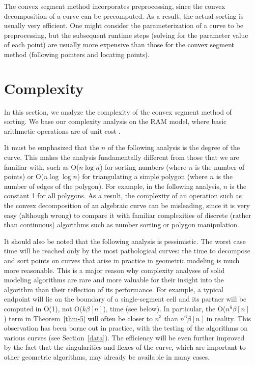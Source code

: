 The convex segment method incorporates preprocessing, since the convex decomposition
of a curve can be precomputed.
As a result, the actual sorting is usually very efficient.
One might consider the parameterization of a curve to be preprocessing, but
the subsequent runtime steps (solving for the parameter value of each point)
are usually more expensive than those for the convex segment method (following pointers
and locating points).

\section{Complexity}
\label{s-c}

In this section, we analyze the complexity of the convex segment method of sorting.
We base our complexity analysis on the RAM model, where basic arithmetic operations
are of unit cost \cite{ahu}.

It must be emphasized that the $n$ of the following analysis is the degree of the curve.
This makes the analysis fundamentally different from those that we
are familiar with, such as O($n \log n$) for sorting numbers (where
$n$ is the number of points) or O($n \log \log n$) for triangulating a simple
polygon (where $n$ is the number of edges of the polygon).
For example, in the following analysis, $n$ is the constant 1 for all polygons.
As a result, the complexity of an operation such as the convex decomposition of an
algebraic curve can be misleading, since it is very easy (although wrong) to 
compare it with familiar complexities of discrete (rather than continuous) algorithms 
such as number sorting or polygon manipulation.

It should also be noted that the following analysis is pessimistic.
The worst case time will be reached only by the most pathological curves: the time to 
decompose and sort points on curves that arise in practice 
in geometric modeling is much more reasonable.
This is a major reason why complexity analyses of solid modeling algorithms are rare
and more valuable for their insight into the algorithm than their reflection of its
performance.
For example, a typical endpoint will lie on the boundary of a single-segment cell and its 
partner will be computed in O(1), not O($k \beta[n]$), time (see below).
In particular, the O($n^{6}\beta[n]$) term in Theorem~\ref{thm-5} will often be
closer to $n^{3}$ than $n^{6}\beta[n]$ in reality.
This observation has been borne out in practice, with the testing of the algorithms on
various curves (see Section~\ref{data}).
The efficiency will be even further improved by the fact that the singularities and 
flexes of the curve, which are important to other geometric algorithms, may already 
be available in many cases.

